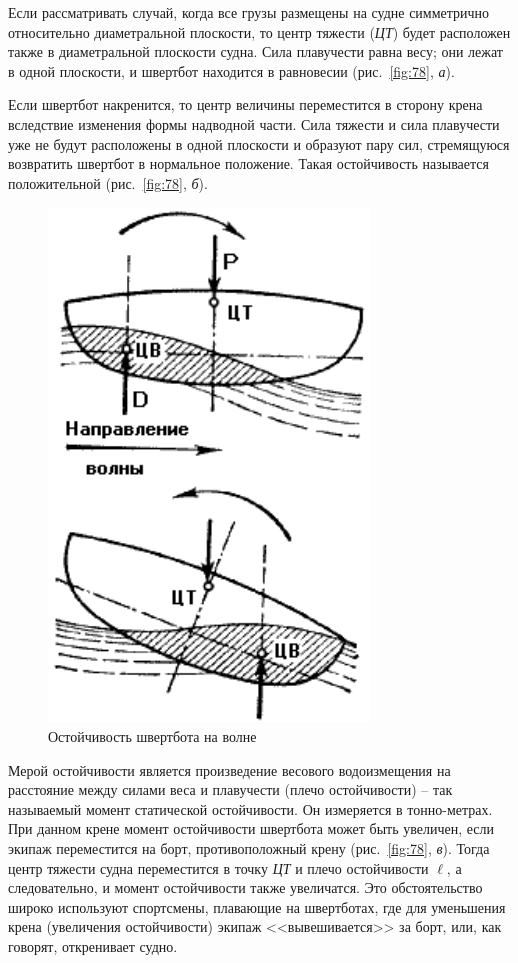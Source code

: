 \documentclass[a4paper, 12pt, twoside, final]{scrbook}
\begin{document}
Если рассматривать случай, когда все грузы размещены на судне симметрично относительно диаметральной плоскости, то центр тяжести (\textit{ЦТ}) будет расположен также в диаметральной плоскости судна. Сила плавучести равна весу; они лежат в одной плоскости, и швертбот находится в равновесии (рис.~\ref{fig:78}, \textit{а}).

Если швертбот накренится, то центр величины переместится в сторону крена вследствие изменения формы надводной части. Сила тяжести и сила плавучести уже не будут расположены в одной плоскости и образуют пару сил, стремящуюся возвратить швертбот в нормальное положение. Такая остойчивость называется положительной (рис.~\ref{fig:78}, \textit{б}).

\begin{figure}
   \centering
   \includegraphics{79_Ostojchivost_shvertbota_na_volne} %
   \caption{Остойчивость швертбота на волне}
   \label{fig:79}
\end{figure}

Мерой остойчивости является произведение весового водоизмещения на расстояние между силами веса и плавучести (плечо остойчивости) \--- так называемый момент статической остойчивости. Он измеряется в тонно-метрах. При данном крене момент остойчивости швертбота может быть увеличен, если экипаж переместится на борт, противоположный крену (рис.~\ref{fig:78}, \textit{в}). Тогда центр тяжести судна переместится в точку \textit{ЦТ} и плечо остойчивости $\ell$, а следовательно, и момент остойчивости также увеличатся. Это обстоятельство широко используют спортсмены, плавающие на швертботах, где для уменьшения крена (увеличения остойчивости) экипаж <<вывешивается>> за борт, или, как говорят, откренивает судно.
\end{document}
